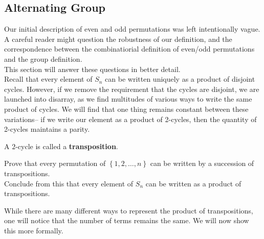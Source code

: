 \documentclass{memoir}
\begin{document}


\subsection{Alternating Group}
\label{subsec:alternating_group}

Our initial description of even and odd permutations was left intentionally vague. A careful reader might question the robustness of our definition, and the correspondence between the combinatiorial definition of even/odd permutations and the group definition.\\

This section will answer these questions in better detail.\\

Recall that every element of \(S_n\) can be written uniquely as a product of disjoint cycles. However, if we remove the requirement that the cycles are disjoint, we are launched into disarray, as we find multitudes of various ways to write the same product of cycles. We will find that one thing remains constant between these variations-- if we write our element as a product of 2-cycles, then the quantity of 2-cycles maintains a parity.
\begin{defn}[Transposition]
	A \(2\)-cycle is called a \textbf{transposition}.
\end{defn}

\begin{hw}
	Prove that every permutation of \(\left\{ 1,2,\ldots,n \right\} \) can be written by a succession of transpositions.\\

	Conclude from this that every element of \(S_n\) can be written as a product of transpositions.
\end{hw}

While there are many different ways to represent the product of transpositions, one will notice that the number of terms remains the same. We will now show this more formally.\\
\end{document}
